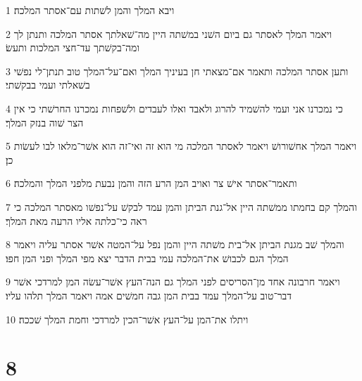\par 1 ויבא המלך והמן לשׁתות עם־אסתר המלכה׃
\par 2 ויאמר המלך לאסתר גם ביום השׁני במשׁתה היין מה־שׁאלתך אסתר המלכה ותנתן לך ומה־בקשׁתך עד־חצי המלכות ותעשׂ׃
\par 3 ותען אסתר המלכה ותאמר אם־מצאתי חן בעיניך המלך ואם־על־המלך טוב תנתן־לי נפשׁי בשׁאלתי ועמי בבקשׁתי׃
\par 4 כי נמכרנו אני ועמי להשׁמיד להרוג ולאבד ואלו לעבדים ולשׁפחות נמכרנו החרשׁתי כי אין הצר שׁוה בנזק המלך׃
\par 5 ויאמר המלך אחשׁורושׁ ויאמר לאסתר המלכה מי הוא זה ואי־זה הוא אשׁר־מלאו לבו לעשׂות כן׃
\par 6 ותאמר־אסתר אישׁ צר ואויב המן הרע הזה והמן נבעת מלפני המלך והמלכה׃
\par 7 והמלך קם בחמתו ממשׁתה היין אל־גנת הביתן והמן עמד לבקשׁ על־נפשׁו מאסתר המלכה כי ראה כי־כלתה אליו הרעה מאת המלך׃
\par 8 והמלך שׁב מגנת הביתן אל־בית משׁתה היין והמן נפל על־המטה אשׁר אסתר עליה ויאמר המלך הגם לכבושׁ את־המלכה עמי בבית הדבר יצא מפי המלך ופני המן חפו׃
\par 9 ויאמר חרבונה אחד מן־הסריסים לפני המלך גם הנה־העץ אשׁר־עשׂה המן למרדכי אשׁר דבר־טוב על־המלך עמד בבית המן גבה חמשׁים אמה ויאמר המלך תלהו עליו׃
\par 10 ויתלו את־המן על־העץ אשׁר־הכין למרדכי וחמת המלך שׁככה׃

\chapter{8}

